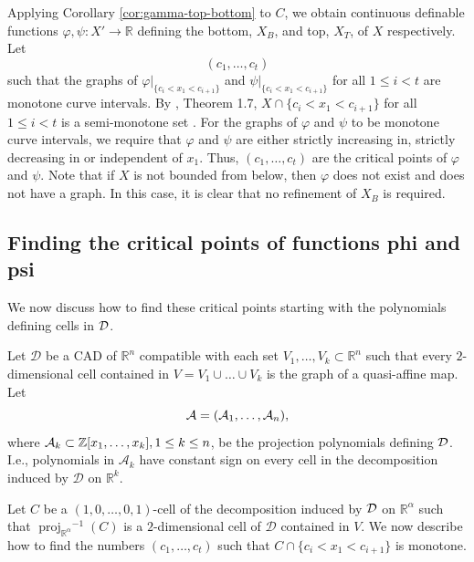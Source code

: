 \documentclass[
]{book}
\theoremstyle{definition}
\theoremstyle{definition}
\theoremstyle{definition}
\theoremstyle{definition}
\theoremstyle{remark}
\begin{document}
Applying Corollary \ref{cor:gamma-top-bottom} to \(C\), we obtain continuous definable functions \(\varphi,\psi : X' \to \mathbb{R}\) defining the bottom, \(X_B\), and top, \(X_T\), of \(X\) respectively.
Let \[
(c_1,\ldots,c_t)
\]
such that the graphs of \(\varphi\vert_{\{ c_i < x_1 < c_{i+1} \}}\) and \(\psi\vert_{\{ c_i < x_1 < c_{i+1} \}}\) for all \(1 \le i < t\) are monotone curve intervals. By \citet{bgv15}, Theorem 1.7, \(X \cap \{ c_i < x_1 < c_{i+1} \}\) for all \(1\le i < t\) is a semi-monotone set \citep[proof of Lemma 3.18]{bgv15}.
For the graphs of \(\varphi\) and \(\psi\) to be monotone curve intervals, we require that \(\varphi\) and \(\psi\) are either strictly increasing in, strictly decreasing in or independent of \(x_1\). Thus, \((c_1,\ldots,c_t)\) are the critical points of \(\varphi\) and \(\psi\).
Note that if \(X\) is not bounded from below, then \(\varphi\) does not exist and does not have a graph.
In this case, it is clear that no refinement of \(X_B\) is required.

\hypertarget{sec:lagrange-refinement}{%
\subsection{Finding the critical points of functions phi and psi}\label{sec:lagrange-refinement}}

We now discuss how to find these critical points starting with the polynomials defining cells in \(\cal D\).

Let \(\mathcal{D}\) be a CAD of \(\mathbb{R}^n\) compatible with each set \(V_1,\ldots,V_k \subset \mathbb{R}^n\) such that every \(2\)-dimensional cell contained in \(V = V_1\cup\ldots\cup V_k\) is the graph of a quasi-affine map. Let
\begin{equation}
{\cal A} = ({\cal A}_1,\ldots,{\cal A}_n),
\label{eq:proj-fac-set}
\end{equation}
where \({\cal A}_k \subset \mathbb{Z}[x_1,\ldots,x_k], 1 \le k \le n\), be the projection polynomials defining \(\cal D\).
I.e., polynomials in \(\mathcal{A}_k\) have constant sign on every cell in the decomposition induced by \(\mathcal{D}\) on \(\mathbb{R}^k\).

Let \(C\) be a \((1,0,\ldots,0,1)\)-cell of the decomposition induced by \(\cal D\) on \(\mathbb{R}^{\alpha}\) such that \({\operatorname{proj}_{\mathbb{R}^{\alpha}}}^{-1}(C)\) is a \(2\)-dimensional cell of \(\mathcal{D}\) contained in \(V\).
We now describe how to find the numbers \((c_1,\ldots,c_t)\) such that \(C \cap \{ c_i < x_1 < c_{i+1} \}\) is monotone.
\end{document}

